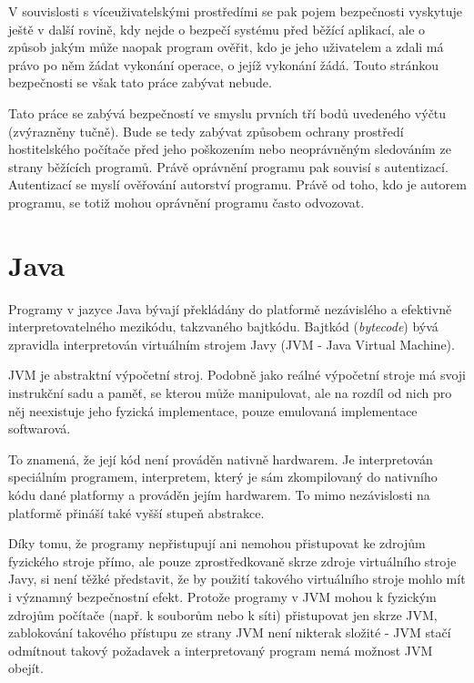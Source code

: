 V souvislosti s víceuživatelskými prostředími se pak pojem bezpečnosti vyskytuje ještě v další rovině, kdy nejde o bezpečí systému před běžící aplikací, ale o způsob jakým může naopak program ověřit, kdo je jeho uživatelem a zdali má právo po něm žádat vykonání operace, o jejíž vykonání žádá. Touto stránkou bezpečnosti se však tato práce zabývat nebude.

Tato práce se zabývá bezpečností ve smyslu prvních tří bodů uvedeného výčtu (zvýrazněny tučně). Bude se tedy zabývat způsobem ochrany prostředí hostitelského počítače před jeho poškozením nebo neoprávněným sledováním ze strany běžících programů. Právě oprávnění programu pak souvisí s autentizací. Autentizací se myslí ověřování autorství programu. Právě od toho, kdo je autorem programu, se totiž mohou oprávnění programu často odvozovat.

\section{Java}

Programy v jazyce Java bývají překládány do platformě nezávislého a efektivně interpretovatelného mezikódu, takzvaného bajtkódu.
Bajtkód ({\it bytecode}) bývá zpravidla interpretován virtuálním strojem Javy (JVM - Java Virtual Machine).

JVM je abstraktní výpočetní stroj. Podobně jako reálné výpočetní stroje má svoji instrukční sadu a paměť, se kterou může manipulovat, ale na rozdíl od nich pro něj neexistuje jeho fyzická implementace, pouze emulovaná implementace softwarová.

To znamená, že její kód není prováděn nativně hardwarem. Je interpretován speciálním programem, interpretem, který je sám zkompilovaný do nativního kódu dané platformy a prováděn jejím hardwarem.
To mimo nezávislosti na platformě přináší také vyšší stupeň abstrakce.

Díky tomu, že programy nepřistupují ani nemohou přistupovat ke zdrojům fyzického stroje přímo, ale pouze zprostředkovaně skrze zdroje virtuálního stroje Javy, si není těžké představit, že by použití takového virtuálního stroje mohlo mít i významný bezpečnostní efekt.
Protože programy v JVM mohou k fyzickým zdrojům počítače (např. k souborům nebo k síti) přistupovat jen skrze JVM, zablokování takového přístupu ze strany JVM není nikterak složité - JVM stačí odmítnout takový požadavek a interpretovaný program nemá možnost JVM obejít.

